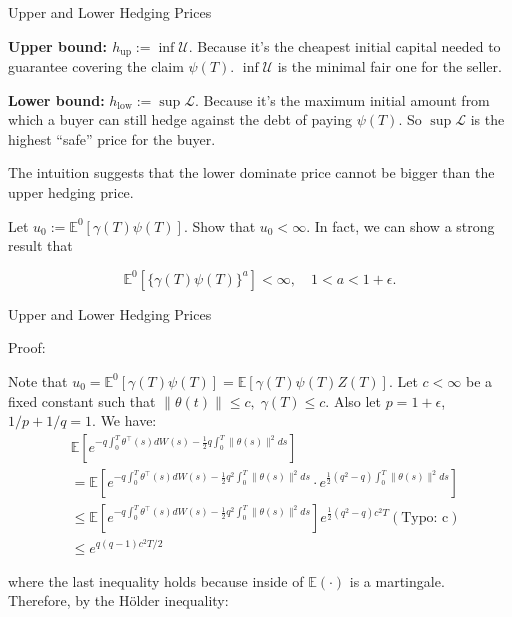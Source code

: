 \documentclass{beamer}
\begin{document}
\begin{frame}{Upper and Lower Hedging Prices}

    {\footnotesize \footnotesize
    \par \textbf{Upper bound: $h_{\text{up}} := \inf \mathcal{U}.$}  Because
     it's the cheapest initial capital needed to guarantee covering the claim $\psi(T)$. $\inf \mathcal{U}$ is 
     the minimal fair one for the seller.
      \vspace{1em}
     \par \textbf{Lower bound:} $h_{\text{low}} := \sup \mathcal{L}.$   Because it's the maximum initial 
     amount from which a buyer can still hedge against the debt of paying $\psi(T)$. 
     So $\sup \mathcal{L}$ is the highest ``safe'' price for the buyer.
     \vspace{1em}
     \par  \pause The intuition suggests that the lower dominate price cannot be bigger than the upper hedging price.
     \vspace{1em}
      \par Let $u_0 := \mathbb{E}^0[\gamma(T)\psi(T)]$. Show that $u_0 < \infty$. In fact, we can show a strong result that

        \[
        \mathbb{E}^0[\{\gamma(T)\psi(T)\}^a] < \infty, \quad 1 < a < 1 + \epsilon.
        \]
    }
\end{frame} 

\begin{frame}{Upper and Lower Hedging Prices}

    {\footnotesize \footnotesize
    \par Proof:
    \par Note that  $u_0 = \mathbb{E}^0[\gamma(T)\psi(T)] = \mathbb{E}[\gamma(T)\psi(T)Z(T)].$ Let $c < \infty$ be a fixed constant such that
    $\|\theta(t)\| \leq c, \;\gamma(T) \leq c.$ Also let $p = 1 + \epsilon$, $1/p + 1/q = 1$. We have:
     \pause 
    \begin{align*}
        & \mathbb{E} \left[ e^{ -q \int_0^T \theta^\top(s)dW(s) - \frac{1}{2} q \int_0^T \|\theta(s)\|^2 ds }  \right] \\
        &= \mathbb{E} \left[e^{ -q \int_0^T \theta^\top(s)dW(s) - \frac{1}{2} q^2 \int_0^T \|\theta(s)\|^2 ds } \cdot e ^{ \frac{1}{2}(q^2 - q) \int_0^T \|\theta(s)\|^2 ds } \right] \\
        &\leq \mathbb{E} \left[ e^ { -q \int_0^T \theta^\top(s)dW(s) - \frac{1}{2} q^2 \int_0^T \|\theta(s)\|^2 ds } \right] e^{ \frac{1}{2}(q^2 - q)c^2T } (\text{Typo: c}) \\
        &\leq e^{q(q-1)c^2T/2}
    \end{align*}
    \par where the last inequality holds because inside of $\mathbb{E}(\cdot)$ is a martingale. Therefore, by the Hölder inequality:
    }
\end{frame} 
\end{document}
